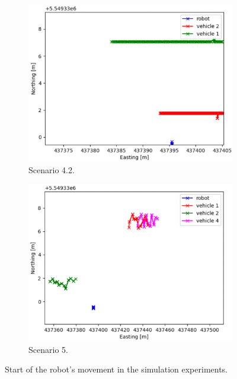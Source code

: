 \begin{figure}[H]
            \begin{subfigure}{0.49\linewidth}
                \centering
                \includegraphics[width=\linewidth]{images/simulations/start_4_2.png}
                \caption{Scenario 4.2.}
            \end{subfigure}
            \begin{subfigure}{0.49\linewidth}
                \centering
                \includegraphics[width=\linewidth]{images/simulations/start_5.png}
                \caption{Scenario 5.}
            \end{subfigure}
            \caption{Start of the robot's movement in the simulation experiments.}
            \label{fig:start}
        \end{figure}
